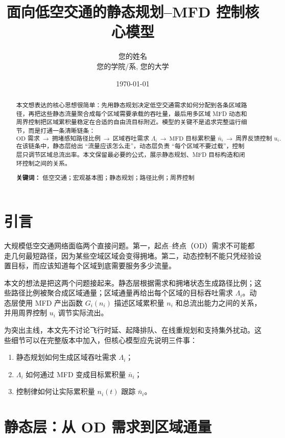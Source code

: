 \documentclass[a4paper,12pt]{article}
\title{\textbf{面向低空交通的静态规划--MFD 控制核心模型}}
\author{您的姓名 \\ 您的学院/系, 您的大学}
\date{\today}
\theoremstyle{plain}
\theoremstyle{definition}
\theoremstyle{remark}
\begin{document}
\maketitle

\begin{abstract}
本文想表达的核心思想很简单：先用静态规划决定低空交通需求如何分配到各条区域路径，再把这些静态流量聚合成每个区域需要承载的吞吐量，最后用多区域 MFD 动态和周界控制把区域累积量稳定在合适的自由流目标附近。模型的关键不是追求完整运行细节，而是打通一条清晰链条：
\[
\text{OD 需求}
\ \rightarrow\
\text{拥堵感知路径比例}
\ \rightarrow\
\text{区域吞吐需求 } \Lambda_i
\ \rightarrow\
\text{MFD 目标累积量 } \bar n_i
\ \rightarrow\
\text{周界反馈控制 } u_i .
\]
在该链条中，静态层给出 ``流量应该怎么走''，动态层负责 ``每个区域不要过载''，控制层只调节区域总流出率。本文保留最必要的公式，展示静态规划、MFD 目标构造和闭环控制之间的关系。

\textbf{关键词：} 低空交通；宏观基本图；静态规划；路径比例；周界控制
\end{abstract}

\section{引言}

大规模低空交通网络面临两个直接问题。第一，起点--终点（OD）需求不可能都走几何最短路径，因为某些空域区域会变得拥堵。第二，动态控制不能只凭经验设置目标，而应该知道每个区域到底需要服务多少流量。

本文的想法是把这两个问题接起来。静态层根据需求和拥堵状态生成路径比例；这些路径比例被聚合成区域通量；区域通量再给出每个区域的目标吞吐需求 $\Lambda_i$。动态层使用 MFD 产出函数 $G_i(n_i)$ 描述区域累积量 $n_i$ 和总流出能力之间的关系，并用周界控制 $u_i$ 调节实际流出。

为突出主线，本文先不讨论飞行时延、起降排队、在线重规划和支持集外扰动。这些细节可以在完整版本中加入，但核心模型应先说明三件事：
\begin{enumerate}
    \item 静态规划如何生成区域吞吐需求 $\Lambda_i$；
    \item $\Lambda_i$ 如何通过 MFD 变成目标累积量 $\bar n_i$；
    \item 控制律如何让实际累积量 $n_i(t)$ 跟踪 $\bar n_i$。
\end{enumerate}

\section{静态层：从 OD 需求到区域通量}
\end{document}
